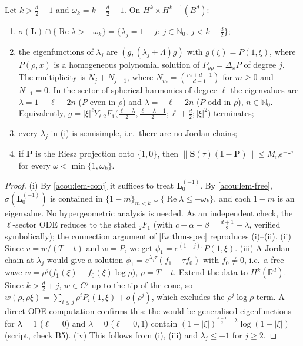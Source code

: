 \begin{proposition}\label{acou:prop-spec}
Let $k>\frac d2+1$ and $\omega_k=k-\frac d2-1$. On $H^k\times H^{k-1}(B^d)$:
\begin{enumerate}[nosep,label=(\roman*)]
\item $\sigma(\mathbf L)\cap\{\operatorname{Re}\lambda>-\omega_k\}=\{\lambda_j=1-j:\ j\in\mathbb N_0,\ j<k-\tfrac d2\}$;
\item the eigenfunctions of $\lambda_j$ are $(g,(\lambda_j+\Lambda)g)$ with
  $g(\xi)=P(1,\xi)$, where $P(\rho,x)$ is a homogeneous polynomial solution of
  $P_{\rho\rho}=\Delta_xP$ of degree $j$. The multiplicity is
  $N_j+N_{j-1}$, where $N_m=\binom{m+d-1}{d-1}$ for $m\ge0$ and $N_{-1}=0$. In the sector of spherical harmonics of degree $\ell$ the
  eigenvalues are $\lambda=1-\ell-2n$ ($P$ even in $\rho$) and
  $\lambda=-\ell-2n$ ($P$ odd in $\rho$), $n\in\mathbb N_0$. Equivalently,
  $g=|\xi|^\ell Y_\ell\,{}_2F_1\big(\tfrac{\ell+\lambda}{2},\tfrac{\ell+\lambda-1}{2};\ell+\tfrac d2;|\xi|^2\big)$
  terminates;
\item every $\lambda_j$ in (i) is semisimple, i.e.\ there are no Jordan chains;
\item if $\mathbf P$ is the Riesz projection onto $\{1,0\}$, then
  $\|\mathbf S(\tau)(\mathbf I-\mathbf P)\|\le M_\omega e^{-\omega\tau}$ for every
  $\omega<\min\{1,\omega_k\}$.
\end{enumerate}
\end{proposition}
\begin{proof}
(i) By \cref{acou:lem-conj} it suffices to treat $\mathbf L_0^{(-1)}$. By
\cref{acou:lem-free}, $\sigma(\mathbf L_0^{(-1)})$ is contained in
$\{1-m\}_{m<k}\cup\{\operatorname{Re}\lambda\le-\omega_k\}$, and each $1-m$
is an eigenvalue. No hypergeometric analysis is needed. As an independent
check, the $\ell$-sector ODE reduces to the stated ${}_2F_1$ (with $c-\alpha-\beta=\frac{d+1}{2}-\lambda$,
verified symbolically); the connection argument of \cref{fw:thm-spec}
reproduces (i)--(ii).
(ii) Since $v=w/(T-t)$ and $w=P$, we get $\phi_1=e^{(1-j)\tau}P(1,\xi)$.
(iii) A Jordan chain at $\lambda_j$ would give a solution
$\phi_1=e^{\lambda_j\tau}(f_1+\tau f_0)$ with $f_0\ne0$, i.e.\ a free wave
$w=\rho^{j}\big(f_1(\xi)-f_0(\xi)\log\rho\big)$, $\rho=T-t$. Extend the data to
$H^k(\mathbb R^d)$. Since $k>\frac d2+j$, $w\in C^j$ up to the tip of the
cone, so $w(\rho,\rho\xi)=\sum_{i\le j}\rho^iP_i(1,\xi)+o(\rho^j)$, which
excludes the $\rho^j\log\rho$ term. A direct ODE computation confirms this:
the would-be generalised eigenfunctions for $\lambda=1$ ($\ell=0$) and
$\lambda=0$ ($\ell=0,1$) contain $(1-|\xi|)^{\frac{d+1}{2}-\lambda}\log(1-|\xi|)$
(script, check B5).
(iv) This follows from (i), (iii) and $\lambda_j\le-1$ for $j\ge2$.
\end{proof}

